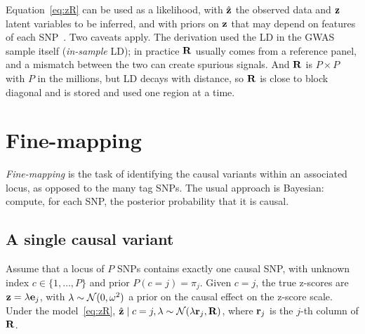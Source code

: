 Equation~\eqref{eq:zR} can be used as a likelihood, with $\hat{\mathbf{z}}$ the observed data and $\mathbf{z}$ latent variables to be inferred, and with priors on $\mathbf{z}$ that may depend on features of each SNP~\citep{hormozdiari2014,zhu2017}. Two caveats apply. The derivation used the LD in the GWAS sample itself (\emph{in-sample} LD); in practice $\mathbf{R}$ usually comes from a reference panel, and a mismatch between the two can create spurious signals. And $\mathbf{R}$ is $P\times P$ with $P$ in the millions, but LD decays with distance, so $\mathbf{R}$ is close to block diagonal and is stored and used one region at a time.

\section{Fine-mapping}
\label{sec:finemap}

\emph{Fine-mapping} is the task of identifying the causal variants within an associated locus, as opposed to the many tag SNPs. The usual approach is Bayesian: compute, for each SNP, the posterior probability that it is causal.

\subsection{A single causal variant}

Assume that a locus of $P$ SNPs contains exactly one causal SNP, with unknown index $c\in\{1,\dots,P\}$ and prior $P(c=j)=\pi_j$. Given $c=j$, the true z-scores are $\mathbf{z}=\lambda\mathbf{e}_j$, with $\lambda\sim\mathcal{N}(0,\omega^2)$ a prior on the causal effect on the z-score scale. Under the model~\eqref{eq:zR}, $\hat{\mathbf{z}}\mid c=j,\lambda\sim\mathcal{N}(\lambda\mathbf{r}_j,\mathbf{R})$, where $\mathbf{r}_j$ is the $j$-th column of $\mathbf{R}$.

